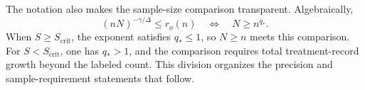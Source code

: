 The notation also makes the sample-size comparison transparent. Algebraically,
\[
(nN)^{-\gamma/\Delta}\le r_o(n)
\quad\Longleftrightarrow\quad
N\ge n^{q_*}.
\]
When \(S\ge S_{\mathrm{crit}}\), the exponent satisfies \(q_*\le1\), so \(N\ge n\) meets this comparison. For \(S<S_{\mathrm{crit}}\), one has \(q_*>1\), and the comparison requires total treatment-record growth beyond the labeled count. This division organizes the precision and sample-requirement statements that follow.
